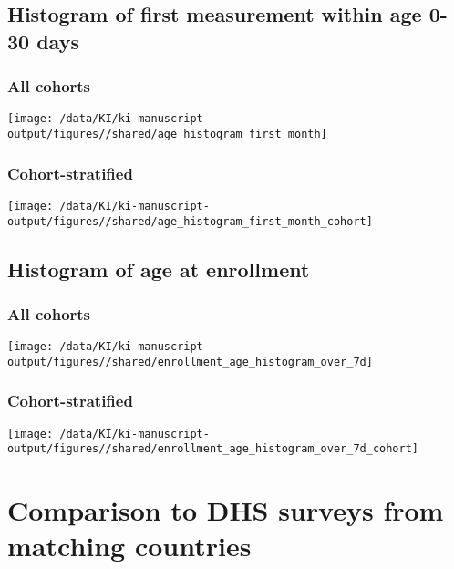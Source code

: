 \documentclass[
  9pt,
]{book}
\begin{document}
\hypertarget{histogram-of-first-measurement-within-age-0-30-days}{%
\section{Histogram of first measurement within age 0-30 days}\label{histogram-of-first-measurement-within-age-0-30-days}}

\hypertarget{all-cohorts}{%
\subsection{All cohorts}\label{all-cohorts}}

\texttt{[image: /data/KI/ki-manuscript-output/figures//shared/age\_histogram\_first\_month]}

\hypertarget{cohort-stratified}{%
\subsection{Cohort-stratified}\label{cohort-stratified}}

\texttt{[image: /data/KI/ki-manuscript-output/figures//shared/age\_histogram\_first\_month\_cohort]}

\hypertarget{histogram-of-age-at-enrollment}{%
\section{Histogram of age at enrollment}\label{histogram-of-age-at-enrollment}}

\hypertarget{all-cohorts-1}{%
\subsection{All cohorts}\label{all-cohorts-1}}

\texttt{[image: /data/KI/ki-manuscript-output/figures//shared/enrollment\_age\_histogram\_over\_7d]}

\hypertarget{cohort-stratified-1}{%
\subsection{Cohort-stratified}\label{cohort-stratified-1}}

\texttt{[image: /data/KI/ki-manuscript-output/figures//shared/enrollment\_age\_histogram\_over\_7d\_cohort]}

\hypertarget{DHS}{%
\chapter{Comparison to DHS surveys from matching countries}\label{DHS}}
\end{document}
